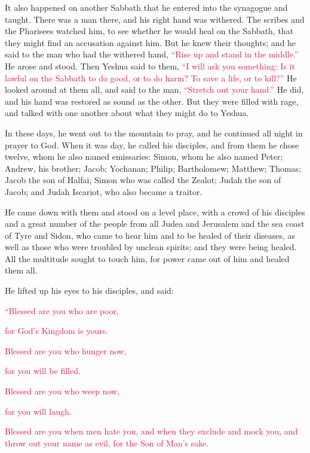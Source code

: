 \myverse{}It also happened on another Sabbath that he entered into the synagogue
and taught. There was a man there, and his right hand was withered.
\myverse{}The scribes and the Pharisees watched him, to see whether he would heal on the
Sabbath, that they might find an accusation against him.
\myverse{}But he knew their thoughts; and he said to the man who had the withered hand,
\textcolor{crimson}{“Rise up and stand in the middle.”} He arose and stood.
\myverse{}Then Yeshua said to them,
\textcolor{crimson}{“I will ask you something: Is it lawful on the Sabbath to do good, or to do harm? To save a life,
	or to kill?”}
\myverse{}He looked around at them all, and said to the man,
\textcolor{crimson}{“Stretch out your hand.”} He did, and his hand was restored as sound as the other.
\myverse{}But they were filled with rage, and talked with one another about what they
might do to Yeshua.

\myverse{}In these days, he went out to the mountain to pray, and he continued
all night in prayer to God.
\myverse{}When it was day, he called his disciples, and from them he chose twelve, whom
he also named emissaries:
\myverse{}Simon, whom he also named Peter; Andrew, his brother; Jacob; Yochanan; Philip;
Bartholomew;
\myverse{}Matthew; Thomas; Jacob the son of Halfai; Simon who was called the Zealot;
\myverse{}Judah the son of Jacob; and Judah Iscariot, who also became a traitor.

\myverse{}He came down with them and stood on a level place, with a crowd
of his disciples and a great number of the people from all Judea and Jerusalem and the sea coast of Tyre
and Sidon, who came to hear him and to be healed of their diseases,
\myverse{}as well as those who were troubled by unclean spirits; and they were being
healed.
\myverse{}All the multitude sought to touch him, for power came out of him and healed
them all.

\myverse{}He lifted up his eyes to his disciples, and said:

\textcolor{crimson}{“Blessed are you who are poor,}

\textcolor{crimson}{for God’s Kingdom is yours.}

\myverse{}\textcolor{crimson}{Blessed are you who hunger now,}

\textcolor{crimson}{for you will be filled.}

\textcolor{crimson}{Blessed are you who weep now,}

\textcolor{crimson}{for you will laugh.}

\myverse{}\textcolor{crimson}{Blessed are you when men hate you, and when they exclude
	and mock you, and throw out your name as evil, for the Son of Man’s sake.
}

